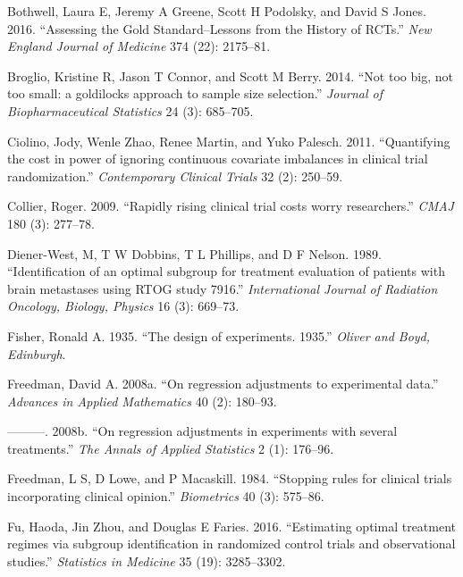 \documentclass[12pt,oneside]{book}
\newlength{\li}\setlength{\li}{14.48pt}
\newlength{\di}\setlength{\di}{-3.5mm}
\theoremstyle{definition}
\theoremstyle{definition}
\theoremstyle{definition}
\theoremstyle{remark}
\begin{document}
\leavevmode\hypertarget{ref-Bothwell:2016bc}{}%
Bothwell, Laura E, Jeremy A Greene, Scott H Podolsky, and David S Jones.
2016. ``Assessing the Gold Standard--Lessons from the History of RCTs.''
\emph{New England Journal of Medicine} 374 (22): 2175--81.

\leavevmode\hypertarget{ref-Broglio:2014fr}{}%
Broglio, Kristine R, Jason T Connor, and Scott M Berry. 2014. ``Not too
big, not too small: a goldilocks approach to sample size selection.''
\emph{Journal of Biopharmaceutical Statistics} 24 (3): 685--705.

\leavevmode\hypertarget{ref-Ciolino:2011ff}{}%
Ciolino, Jody, Wenle Zhao, Renee Martin, and Yuko Palesch. 2011.
``Quantifying the cost in power of ignoring continuous covariate
imbalances in clinical trial randomization.'' \emph{Contemporary
Clinical Trials} 32 (2): 250--59.

\leavevmode\hypertarget{ref-Collier:2009du}{}%
Collier, Roger. 2009. ``Rapidly rising clinical trial costs worry
researchers.'' \emph{CMAJ} 180 (3): 277--78.

\leavevmode\hypertarget{ref-DienerWest:1989uq}{}%
Diener-West, M, T W Dobbins, T L Phillips, and D F Nelson. 1989.
``Identification of an optimal subgroup for treatment evaluation of
patients with brain metastases using RTOG study 7916.''
\emph{International Journal of Radiation Oncology, Biology, Physics} 16
(3): 669--73.

\leavevmode\hypertarget{ref-fisher1935design}{}%
Fisher, Ronald A. 1935. ``The design of experiments. 1935.''
\emph{Oliver and Boyd, Edinburgh}.

\leavevmode\hypertarget{ref-Freedman:2008eq}{}%
Freedman, David A. 2008a. ``On regression adjustments to experimental
data.'' \emph{Advances in Applied Mathematics} 40 (2): 180--93.

\leavevmode\hypertarget{ref-Freedman:2008em}{}%
---------. 2008b. ``On regression adjustments in experiments with
several treatments.'' \emph{The Annals of Applied Statistics} 2 (1):
176--96.

\leavevmode\hypertarget{ref-Freedman:1984wz}{}%
Freedman, L S, D Lowe, and P Macaskill. 1984. ``Stopping rules for
clinical trials incorporating clinical opinion.'' \emph{Biometrics} 40
(3): 575--86.

\leavevmode\hypertarget{ref-Fu:2016jy}{}%
Fu, Haoda, Jin Zhou, and Douglas E Faries. 2016. ``Estimating optimal
treatment regimes via subgroup identification in randomized control
trials and observational studies.'' \emph{Statistics in Medicine} 35
(19): 3285--3302.
\end{document}
